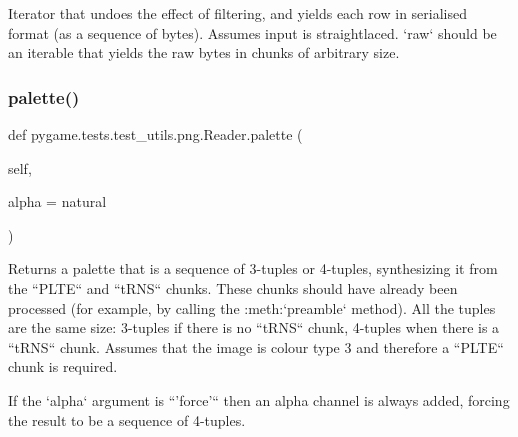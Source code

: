 \begin{DoxyVerb}Iterator that undoes the effect of filtering, and yields each
row in serialised format (as a sequence of bytes).  Assumes input
is straightlaced.  `raw` should be an iterable that yields the
raw bytes in chunks of arbitrary size.\end{DoxyVerb}
 \mbox{\label{classpygame_1_1tests_1_1test__utils_1_1png_1_1_reader_a4cf5de7497f78c75ec9f8178862db95f}} 
\subsubsection{\texorpdfstring{palette()}{palette()}}
{\footnotesize\ttfamily def pygame.\+tests.\+test\+\_\+utils.\+png.\+Reader.\+palette (\begin{DoxyParamCaption}\item[{}]{self,  }\item[{}]{alpha = {\ttfamily \textquotesingle{}natural\textquotesingle{}} }\end{DoxyParamCaption})}

\begin{DoxyVerb}Returns a palette that is a sequence of 3-tuples or 4-tuples,
synthesizing it from the ``PLTE`` and ``tRNS`` chunks.  These
chunks should have already been processed (for example, by
calling the :meth:`preamble` method).  All the tuples are the
same size: 3-tuples if there is no ``tRNS`` chunk, 4-tuples when
there is a ``tRNS`` chunk.  Assumes that the image is colour type
3 and therefore a ``PLTE`` chunk is required.

If the `alpha` argument is ``'force'`` then an alpha channel is
always added, forcing the result to be a sequence of 4-tuples.
\end{DoxyVerb}
 \mbox{\label{classpygame_1_1tests_1_1test__utils_1_1png_1_1_reader_a0eaa36df8274855df52028321fe2d945}} 

